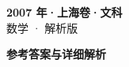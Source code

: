 \documentclass[zihao=-4, a4paper]{ctexart}
\begin{document}
\begin{center}
  {\Large\bfseries 2007 年·上海卷·文科}\\[4pt]
  {\large 数学 · 解析版}
\end{center}
\medskip
{}

\clearpage
{}
\begin{center}{\Large\bfseries 参考答案与详细解析}\end{center}
\medskip

\end{document}
